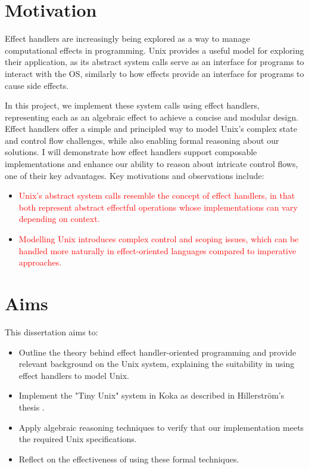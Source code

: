 \documentclass[logo,bsc,singlespacing,parskip]{infthesis}
\begin{document}
\section{Motivation}
Effect handlers are increasingly being explored as a way to manage computational effects in programming. Unix provides a useful model for exploring their application, as its abstract system calls serve as an interface for programs to interact with the OS, similarly to how effects provide an interface for programs to cause side effects. 

In this project, we implement these system calls using effect handlers, representing each as an algebraic effect to achieve a concise and modular design. Effect handlers offer a simple and principled way to model Unix’s complex state and control flow challenges, while also enabling formal reasoning about our solutions. I will demonstrate how effect handlers support composable implementations and enhance our ability to reason about intricate control flows, one of their key advantages.
Key motivations and observations include:
\begin{itemize}
    \item \textcolor{red}{Unix’s abstract system calls resemble the concept of effect handlers, in that both represent abstract effectful operations whose implementations can vary depending on context.}
    \item \textcolor{red}{Modelling Unix introduces complex control and scoping issues, which can be handled more naturally in effect-oriented languages compared to imperative approaches. }
\end{itemize}


\section{Aims}
This dissertation aims to:
\begin{itemize}
    \item Outline the theory behind effect handler-oriented programming and provide relevant background on the Unix system, explaining the suitability in using effect handlers to model Unix.
    \item Implement the "Tiny Unix" system in Koka as described in Hillerström's thesis \cite{hillerstrom_foundations_nodate}.
    \item Apply algebraic reasoning techniques to verify that our implementation meets the required Unix specifications. 
    \item Reflect on the effectiveness of using these formal techniques.
    
\end{itemize}
\end{document}
